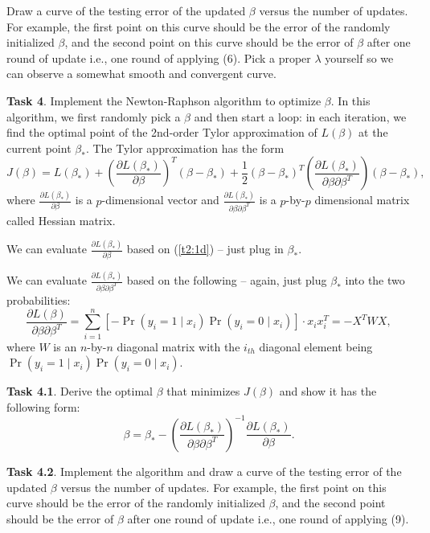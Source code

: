 \documentclass{llncs}
\begin{document}
Draw a curve of the testing error of the updated 
$\beta$ versus the number of updates. 
For example, the first point on this curve should 
be the error of the randomly initialized $\beta$, 
and the second point on this curve should be 
the error of $\beta$ after one round of update 
i.e., one round of applying (6). 
Pick a proper $\lambda$ yourself so we can 
observe a somewhat smooth and convergent curve. 


\textbf{Task 4}. Implement the Newton-Raphson algorithm to 
optimize $\beta$. In this algorithm, we first randomly 
pick a $\beta$ and then start a loop: in each iteration, 
we find the optimal point of the 2nd-order Tylor approximation of $L(\beta)$ at the current point
$\beta_*$. The Tylor approximation has the form 
\begin{equation}
J(\beta) = L(\beta_*) + \left(\frac{\partial L(\beta_*)}{\partial \beta}\right)^T (\beta - \beta_*) + \frac{1}{2} 
(\beta - \beta_*)^T \left(\frac{\partial L(\beta_*)}{
\partial \beta \partial \beta^T} \right)
(\beta - \beta_*), 
\end{equation}
where $\frac{\partial L(\beta_*)}{\partial \beta}$ 
is a $p$-dimensional vector and 
$\frac{\partial L(\beta_*)}{\partial \beta 
\partial \beta^T}$ is a $p$-by-$p$ dimensional 
matrix called Hessian matrix. 

We can evaluate 
$\frac{\partial L(\beta_*)}{\partial \beta}$ 
based on (\ref{t2:1d}) -- just plug in $\beta_*$. 

We can evaluate $\frac{\partial L(\beta_*)}{\partial \beta \partial \beta^T}$ based on the following -- again, 
just plug $\beta_*$ into the two probabilities: 
\begin{equation}
\frac{\partial L(\beta)}{\partial \beta 
\partial \beta^T} = \sum_{i=1}^n 
[- \Pr(y_i = 1\mid x_i) \Pr(y_i = 0\mid x_i)] 
\cdot x_i x_i^T = - X^T W X, 
\end{equation}
where $W$ is an $n$-by-$n$ diagonal matrix 
with the $i_{th}$ diagonal element being 
$\Pr(y_i = 1\mid x_i) \Pr(y_i = 0\mid x_i)$. 

\textbf{Task 4.1}. Derive the optimal $\beta$ that 
minimizes $J(\beta)$ and show it has the following form: 
\begin{equation}
\beta = \beta_* - \left(\frac{\partial L(\beta_*)}{
\partial \beta \partial \beta^T}\right)^{-1} 
\frac{\partial L(\beta_*)}{\partial \beta}. 
\end{equation}

\textbf{Task 4.2}. Implement the algorithm and draw 
a curve of the testing error of the updated 
$\beta$ versus the number of updates. 
For example, the first point on this curve should 
be the error of the randomly initialized $\beta$, 
and the second point should be 
the error of $\beta$ after one round of update 
i.e., one round of applying (9). 
\end{document}
